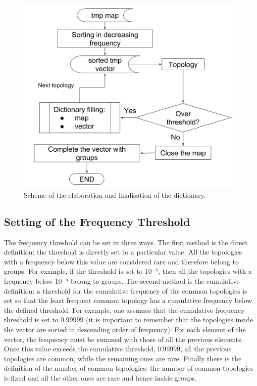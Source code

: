 %
\begin{figure}
  \centering
  \includegraphics[scale=0.6]{figures/build.png}
  \caption{Scheme of the elaboration and finalisation of the dictionary.}
  \label{fig:buildic}
\end{figure}
%
\subsection{Setting of the Frequency Threshold}
\label{sec:thr}
The frequency threshold can be set in three ways. The first method is the direct definition: the threshold is directly set to a particular value. All the topologies with a frequency below this value are considered rare and therefore belong to groups. For example, if the threshold is set to 10$^{-5}$, then all the topologies with a frequency below 10$^{-5}$ belong to groups. The second method is the cumulative definition: a threshold for the cumulative frequency of the common topologies is set so that the least frequent common topology has a cumulative frequency below the defined threshold. For example, one assumes that the cumulative frequency threshold is set to 0.99999 (it is important to remember that the topologies inside the vector are sorted in descending order of frequency). For each element of the vector, the frequency must be summed with those of all the previous elements. Once this value exceeds the cumulative threshold, 0.99999, all the previous topologies are common, while the remaining ones are rare. Finally there is the definition of the number of common topologies: the number of common topologies is fixed and all the other ones are rare and hence inside groups.
